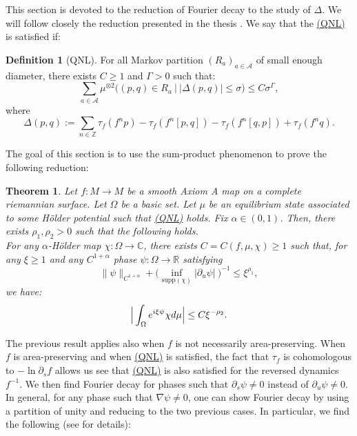 \documentclass[a4paper]{article}
\newtheorem{theorem}{Theorem}[section]
\theoremstyle{definition}
\newtheorem{definition}{Definition}[section]
\begin{document}
This section is devoted to the reduction of Fourier decay to the study of $\Delta$. We will follow closely the reduction presented in the thesis \cite{Le24}. We say that the  \hyperref[QNL]{(QNL)} is satisfied if:

\begin{definition}[QNL]\label{QNL}
For all Markov partition $(R_a)_{a \in \mathcal{A}}$ of small enough diameter, there exists $C \geq 1$ and $\Gamma>0$ such that:
$$ \sum_{a \in \mathcal{A}} \mu^{\otimes 2}\Big( (p,q) \in R_a \ \Big| \ |\Delta(p,q)| \leq \sigma \Big) \leq C \sigma^\Gamma ,$$
where
$$ \Delta(p,q) := \sum_{n \in \mathbb{Z}} \tau_f(f^n p) -  \tau_f(f^n [p,q]) -  \tau_f(f^n [q,p]) +  \tau_f(f^n q) .$$
\end{definition}

The goal of this section is to use the sum-product phenomenon to prove the following reduction:

\begin{theorem}\label{th:reduc1}
Let $f:M \rightarrow M$ be a smooth Axiom A map on a complete riemannian surface. Let $\Omega$ be a basic set. Let $\mu$ be an equilibrium state associated to some Hölder potential such that \hyperref[QNL]{(QNL)} holds.
Fix $\alpha \in (0,1)$. Then, there exists $\rho_1,\rho_2>0$ such that the following holds. \\

For any $\alpha$-Hölder map $\chi : \Omega 
\rightarrow \mathbb{C}$, there exists $C=C({f,\mu,\chi}) \geq 1$ such that, for any $\xi \geq 1$ and any $C^{1+\alpha}$ phase $\psi: \Omega \rightarrow \mathbb{R}$ satisfying $$\|\psi\|_{C^{1+\alpha}} + \big(\inf_{\text{supp}(\chi)} |\partial_u \psi| \ \big)^{-1} \leq \xi^{\rho_1}, $$
we have:
$$ \Big{|} \int_\Omega e^{i \xi \psi } \chi d\mu \Big{|} \leq C \xi^{-\rho_2} .$$
\end{theorem}

The previous result applies also when $f$ is not necessarily area-preserving. When $f$ is area-preserving and when \hyperref[QNL]{(QNL)} is satisfied, the fact that $\tau_f$ is cohomologous to $-\ln \partial_s f$ allows us see that \hyperref[QNL]{(QNL)} is also satisfied for the reversed dynamics $f^{-1}$. We then find Fourier decay for phases such that $\partial_s \psi \neq 0$ instead of $\partial_u \psi \neq 0$. In general, for any phase such that $\nabla \psi \neq 0$, one can show Fourier decay by using a partition of unity and reducing to the two previous cases. In particular, we find the following (see \cite{Le24} for details):
\end{document}
